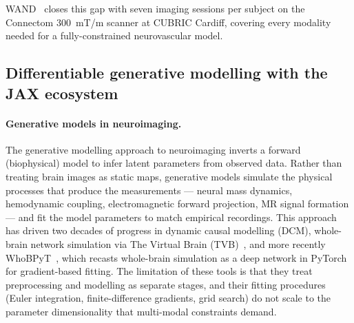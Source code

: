 \documentclass[11pt,a4paper]{article}\usepackage[]{graphicx}\usepackage[]{xcolor}
\begin{document}
WAND~\citep{Mayerand2025wand} closes this gap with seven imaging sessions
per subject on the Connectom 300~mT/m scanner at CUBRIC Cardiff,
covering every modality needed for a fully-constrained neurovascular model.

\subsection{Differentiable generative modelling with the JAX ecosystem}

\paragraph{Generative models in neuroimaging.}
The generative modelling approach to neuroimaging inverts a forward
(biophysical) model to infer latent parameters from observed data.
Rather than treating brain images as static maps, generative models
simulate the physical processes that produce the measurements ---
neural mass dynamics, hemodynamic coupling, electromagnetic forward
projection, MR signal formation --- and fit the model parameters to
match empirical recordings. This approach has driven two decades of
progress in dynamic causal modelling (DCM), whole-brain network
simulation via The Virtual Brain
(TVB)~\citep{SanzLeon2013tvb}, and more recently
WhoBPyT~\citep{Griffiths2024whobpyt}, which recasts whole-brain
simulation as a deep network in PyTorch for gradient-based fitting.
The limitation of these tools is that they treat preprocessing and
modelling as separate stages, and their fitting procedures (Euler
integration, finite-difference gradients, grid search) do not scale
to the parameter dimensionality that multi-modal constraints demand.
\end{document}
